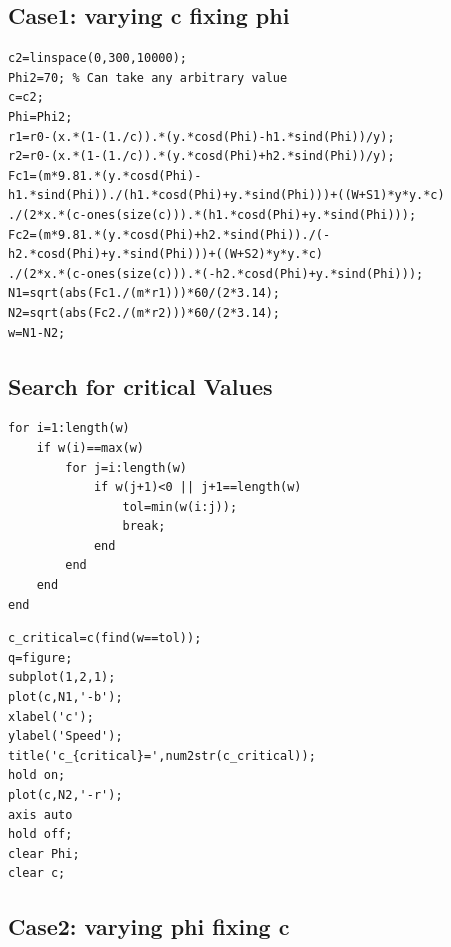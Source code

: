 \documentclass[15pt,a4paper,oneside]{article}
\begin{document}
\subsection*{Case1: varying c fixing phi}

\begin{verbatim}
c2=linspace(0,300,10000);
Phi2=70; % Can take any arbitrary value
c=c2;
Phi=Phi2;
r1=r0-(x.*(1-(1./c)).*(y.*cosd(Phi)-h1.*sind(Phi))/y);
r2=r0-(x.*(1-(1./c)).*(y.*cosd(Phi)+h2.*sind(Phi))/y);
Fc1=(m*9.81.*(y.*cosd(Phi)-h1.*sind(Phi))./(h1.*cosd(Phi)+y.*sind(Phi)))+((W+S1)*y*y.*c)
./(2*x.*(c-ones(size(c))).*(h1.*cosd(Phi)+y.*sind(Phi)));
Fc2=(m*9.81.*(y.*cosd(Phi)+h2.*sind(Phi))./(-h2.*cosd(Phi)+y.*sind(Phi)))+((W+S2)*y*y.*c)
./(2*x.*(c-ones(size(c))).*(-h2.*cosd(Phi)+y.*sind(Phi)));
N1=sqrt(abs(Fc1./(m*r1)))*60/(2*3.14);
N2=sqrt(abs(Fc2./(m*r2)))*60/(2*3.14);
w=N1-N2;
\end{verbatim}
\subsection*{Search for critical Values}

\begin{verbatim}
for i=1:length(w)
    if w(i)==max(w)
        for j=i:length(w)
            if w(j+1)<0 || j+1==length(w)
                tol=min(w(i:j));
                break;
            end
        end
    end
end
\end{verbatim}
\begin{verbatim}
c_critical=c(find(w==tol));
q=figure;
subplot(1,2,1);
plot(c,N1,'-b');
xlabel('c');
ylabel('Speed');
title('c_{critical}=',num2str(c_critical));
hold on;
plot(c,N2,'-r');
axis auto
hold off;
clear Phi;
clear c;
\end{verbatim}

\subsection*{Case2: varying phi fixing c}
\end{document}

